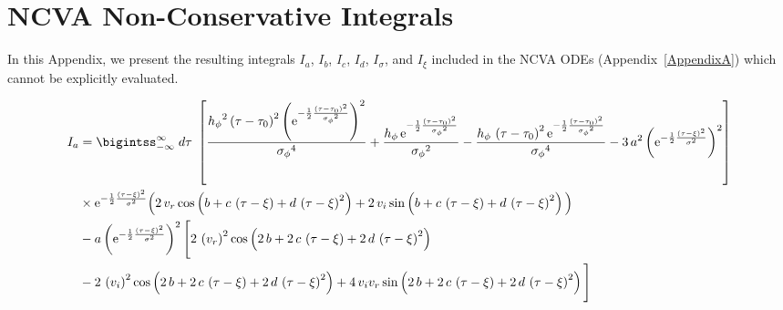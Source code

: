 \section{NCVA Non-Conservative Integrals} %
\label{AppendixB} %

In this Appendix, we present the resulting integrals $I_a$, $I_b$, $I_c$, $I_d$, $I_{\sigma}$, and $I_{\xi}$ included in the NCVA ODEs (Appendix~\ref{AppendixA}) which cannot be explicitly evaluated.

\small
\begin{align}
I_a & =  \bigintss_{-\infty}^{\infty} \; d\tau\; \left[ \frac{{{ h_{\phi}}}^{2} \left( \tau-{ \tau_0} \right) ^{2} \left( {
{\rm e}^{-\frac{1}{2}{\frac { \left( \tau-{ \tau_0} \right) ^{2}}{{{ 
\sigma_{\phi}}}^{2}}}}} \right) ^{2}}{{{ \sigma_{\phi}}}^{4}}+ \frac{{ h_{\phi}}
\,{{\rm e}^{-\frac{1}{2}{\frac { \left( \tau-{ \tau_0} \right) ^{2}}{{{ 
\sigma_{\phi}}}^{2}}}}}}{{{ \sigma_{\phi}}}^{2}} -\frac{{ h_{\phi}}\, \left( \tau-{
 \tau_0} \right) ^{2}{{\rm e}^{-\frac{1}{2}{\frac { \left( \tau-{ \tau_0}
 \right) ^{2}}{{{ \sigma_{\phi}}}^{2}}}}}}{{{ \sigma_{\phi}}}^{4}}-3\,{a
}^{2} \left( {{\rm e}^{-\frac{1}{2}{\frac { \left( \tau-\xi \right) ^{2}}{
{\sigma}^{2}}}}} \right) ^{2} \right] \nonumber \\
& \times {{\rm e}^{-\frac{1}{2}{\frac { \left( 
\tau-\xi \right) ^{2}}{{\sigma}^{2}}}}}  \Big( 2\, v_r \cos \left( b+c\, \left( \tau-\xi \right) +d\,
 \left( \tau-\xi \right) ^{2} \right) +2\,v_i \sin \left( b+c\, \left( \tau-\xi \right) +d\, \left( \tau-{
 \xi} \right) ^{2} \right)  \Big)  \nonumber \\
 &- a \left( {{\rm e}^{-\frac{1}{2}{
\frac { \left( \tau-\xi \right) ^{2}}{{\sigma}^{2}}}}} \right) ^{2}
 \Bigg[ 2\, \left( v_r \right) ^{2}
\cos \left( 2\,b+2\,c\, \left( \tau-\xi \right) +2\,d\, \left( \tau-{
 \xi} \right) ^{2} \right) \nonumber \\
 &-2\, \left( v_i  \right) ^{2}\cos \left( 2\,b+2\,c\, \left( \tau-\xi
 \right) +2\,d\, \left( \tau-\xi \right) ^{2} \right) +4\,v_i v_r \sin
 \left( 2\,b+2\,c\, \left( \tau-\xi \right) +2\,d\, \left( \tau-{ \xi
} \right) ^{2} \right)  \Bigg] 
\end{align}

